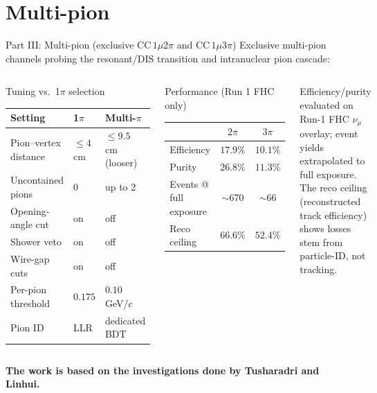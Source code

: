 \documentclass[aspectratio=169,10pt]{beamer}
\begin{document}
\section{Multi-pion}
\begin{frame}{Part III: Multi-pion (exclusive CC$\,1\mu2\pi$ and CC$\,1\mu3\pi$)}
  \footnotesize
  Exclusive multi-pion channels probing the resonant/DIS transition and intranuclear pion cascade:
  \begin{columns}[T]
  \begin{block}{Tuning vs.\ 1$\pi$ selection}\scriptsize
  \begin{tabular}{lll}
  \toprule Setting & 1$\pi$ & Multi-$\pi$\\\midrule
  Pion--vertex distance & $\le4$ cm & \alert{$\le9.5$ cm} (looser)\\
  Uncontained pions    & 0 & up to 2\\
  Opening-angle cut    & on & off\\
  Shower veto          & on & off\\
  Wire-gap cuts        & on & off\\
  Per-pion threshold   & $0.175$ & $0.10$ GeV/$c$\\
  Pion ID              & LLR & dedicated BDT\\
  \bottomrule
  \end{tabular}
  \end{block}
  \begin{block}{Performance (Run 1 FHC only)}\scriptsize
  \begin{tabular}{lcc}
  \toprule & $2\pi$ & $3\pi$\\\midrule
  Efficiency & $17.9\%$ & $10.1\%$\\
  Purity     & $26.8\%$ & $11.3\%$\\
  Events @ full exposure & $\sim$670 & $\sim$66\\
  Reco ceiling & $66.6\%$ & $52.4\%$\\
  \bottomrule
  \end{tabular}
  \end{block}
  {\scriptsize Efficiency/purity evaluated on Run-1 FHC $\nu_\mu$ overlay; event yields extrapolated to full exposure.\\[1mm]
  The \alert{reco ceiling} (reconstructed track efficiency) shows losses stem from \alert{particle-ID}, not tracking.}
  \end{columns}

\bigskip 
  \textbf{The work is based on the investigations done by Tusharadri and Linhui.}
\end{frame}
\end{document}

